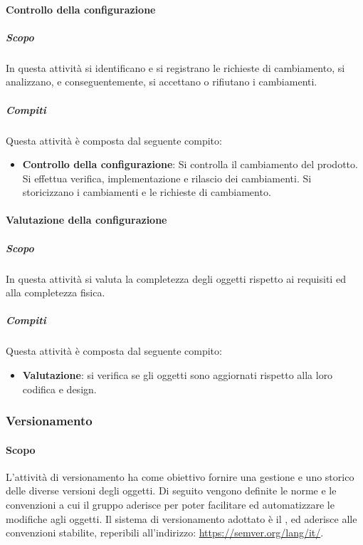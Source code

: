 \paragraph{Controllo della configurazione}
\label{par:controllo_della_configurazione}
\subparagraph{Scopo}
\label{par:controllo_della_configurazione:scopo}
In questa attività si identificano e si registrano le richieste di cambiamento, si analizzano, e conseguentemente, si accettano o rifiutano i cambiamenti.
\subparagraph{Compiti}
\label{par:controllo_della_configurazione:compiti}
Questa attività è composta dal seguente compito:
\begin{itemize}
    \item \textbf{Controllo della configurazione}: Si controlla il cambiamento del prodotto. Si effettua verifica, implementazione e rilascio dei cambiamenti. Si storicizzano i cambiamenti e le richieste di cambiamento.
\end{itemize}

\paragraph{Valutazione della configurazione}
\label{par:valutazione_della_configurazione}
\subparagraph{Scopo}
\label{par:valutazione_della_configurazione:scopo}
In questa attività si valuta la completezza degli oggetti rispetto ai requisiti ed alla completezza fisica.
\subparagraph{Compiti}
\label{par:valutazione_della_configurazione:compiti}
Questa attività è composta dal seguente compito:
\begin{itemize}
    \item \textbf{Valutazione}: si verifica se gli oggetti sono aggiornati rispetto alla loro codifica e design.
\end{itemize}


\subsubsection{Versionamento}
\label{ssub:gestione_configurazione:versionamento}

\paragraph{Scopo}

L'attività di versionamento ha come obiettivo fornire una gestione e uno storico delle diverse versioni degli oggetti. Di seguito vengono
definite le norme e le convenzioni a cui il gruppo aderisce per poter facilitare ed automatizzare le modifiche agli oggetti.
Il sistema di versionamento adottato è il , ed aderisce alle convenzioni stabilite, reperibili all'indirizzo: \url{https://semver.org/lang/it/}.

